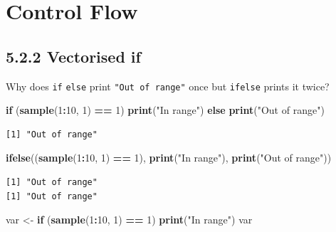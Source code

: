 \documentclass[]{book}
\newenvironment{Shaded}{\begin{snugshade}}{\end{snugshade}}
\newcommand{\ControlFlowTok}[1]{\textcolor[rgb]{0.13,0.29,0.53}{\textbf{#1}}}
\newcommand{\DecValTok}[1]{\textcolor[rgb]{0.00,0.00,0.81}{#1}}
\newcommand{\KeywordTok}[1]{\textcolor[rgb]{0.13,0.29,0.53}{\textbf{#1}}}
\newcommand{\NormalTok}[1]{#1}
\newcommand{\OperatorTok}[1]{\textcolor[rgb]{0.81,0.36,0.00}{\textbf{#1}}}
\newcommand{\StringTok}[1]{\textcolor[rgb]{0.31,0.60,0.02}{#1}}
\begin{document}
\hypertarget{control-flow}{%
\chapter{Control Flow}\label{control-flow}}

\hypertarget{vectorised-if}{%
\section*{5.2.2 Vectorised if}\label{vectorised-if}}

Why does \texttt{if} \texttt{else} print \texttt{"Out\ of\ range"} once but \texttt{ifelse} prints it twice?

\begin{Shaded}
\begin{Highlighting}[]
\ControlFlowTok{if}\NormalTok{ (}\KeywordTok{sample}\NormalTok{(}\DecValTok{1}\OperatorTok{:}\DecValTok{10}\NormalTok{, }\DecValTok{1}\NormalTok{) }\OperatorTok{==}\StringTok{ }\DecValTok{1}\NormalTok{) }\KeywordTok{print}\NormalTok{(}\StringTok{"In range"}\NormalTok{) }\ControlFlowTok{else} \KeywordTok{print}\NormalTok{(}\StringTok{"Out of range"}\NormalTok{)}
\end{Highlighting}
\end{Shaded}

\begin{verbatim}
[1] "Out of range"
\end{verbatim}

\begin{Shaded}
\begin{Highlighting}[]
\KeywordTok{ifelse}\NormalTok{((}\KeywordTok{sample}\NormalTok{(}\DecValTok{1}\OperatorTok{:}\DecValTok{10}\NormalTok{, }\DecValTok{1}\NormalTok{) }\OperatorTok{==}\StringTok{ }\DecValTok{1}\NormalTok{), }\KeywordTok{print}\NormalTok{(}\StringTok{"In range"}\NormalTok{), }\KeywordTok{print}\NormalTok{(}\StringTok{"Out of range"}\NormalTok{))}
\end{Highlighting}
\end{Shaded}

\begin{verbatim}
[1] "Out of range"
[1] "Out of range"
\end{verbatim}

\begin{Shaded}
\begin{Highlighting}[]
\NormalTok{var <-}\StringTok{ }\ControlFlowTok{if}\NormalTok{ (}\KeywordTok{sample}\NormalTok{(}\DecValTok{1}\OperatorTok{:}\DecValTok{10}\NormalTok{, }\DecValTok{1}\NormalTok{) }\OperatorTok{==}\StringTok{ }\DecValTok{1}\NormalTok{) }\KeywordTok{print}\NormalTok{(}\StringTok{"In range"}\NormalTok{)}
\NormalTok{var}
\end{Highlighting}
\end{Shaded}
\end{document}
